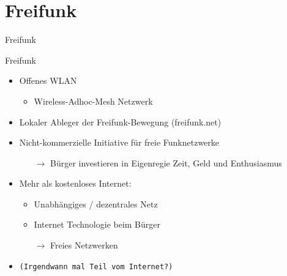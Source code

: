 \section{Freifunk}
\begin{frame}{}
    \begin{center}
        Freifunk
     \end{center}
\end{frame}

\begin{frame}{Freifunk}
    \begin{itemize}
        \item Offenes WLAN
        \begin{itemize}
            \item Wireless-Adhoc-Mesh Netzwerk
        \end{itemize}
        \item Lokaler Ableger der Freifunk-Bewegung (freifunk.net)
        \item Nicht-kommerzielle Initiative für freie Funknetzwerke
        \begin{itemize}
            \item[$\rightarrow$] Bürger investieren in Eigenregie Zeit, Geld und Enthusiasmus
        \end{itemize}
        \item Mehr als \glqq{}kostenloses Internet\grqq:
        \begin{itemize}
            \item Unabhängiges / dezentrales Netz
            \item Internet Technologie beim Bürger
            \item[$\rightarrow$] Freies Netzwerken
        \end{itemize}
    \item \texttt{\small{}(Irgendwann mal Teil vom Internet?)}
    \end{itemize}
\end{frame}

